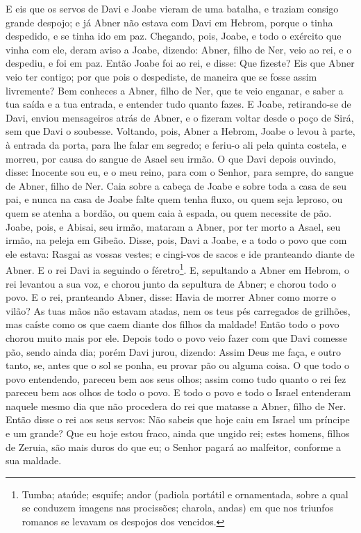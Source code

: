 E eis que os servos de Davi e Joabe vieram de uma batalha, e
traziam consigo grande despojo; e já Abner não estava com Davi em
Hebrom, porque o tinha despedido, e se tinha ido em paz.
Chegando, pois, Joabe, e todo o exército que vinha com ele,
deram aviso a Joabe, dizendo: Abner, filho de Ner, veio ao rei, e o
despediu, e foi em paz. Então Joabe foi ao rei, e disse: Que
fizeste? Eis que Abner veio ter contigo; por que pois o despediste,
de maneira que se fosse assim livremente? Bem conheces a
Abner, filho de Ner, que te veio enganar, e saber a tua saída e a
tua entrada, e entender tudo quanto fazes. E Joabe,
retirando-se de Davi, enviou mensageiros atrás de Abner, e o fizeram
voltar desde o poço de Sirá, sem que Davi o soubesse.
Voltando, pois, Abner a Hebrom, Joabe o levou à parte, à
entrada da porta, para lhe falar em segredo; e feriu-o ali pela
quinta costela, e morreu, por causa do sangue de Asael seu irmão.
O que Davi depois ouvindo, disse: Inocente sou eu, e o meu
reino, para com o Senhor, para sempre, do sangue de Abner, filho de
Ner. Caia sobre a cabeça de Joabe e sobre toda a casa de seu
pai, e nunca na casa de Joabe falte quem tenha fluxo, ou quem seja
leproso, ou quem se atenha a bordão, ou quem caia à espada, ou quem
necessite de pão. Joabe, pois, e Abisai, seu irmão, mataram a
Abner, por ter morto a Asael, seu irmão, na peleja em Gibeão.
Disse, pois, Davi a Joabe, e a todo o povo que com ele
estava: Rasgai as vossas vestes; e cingi-vos de sacos e ide
pranteando diante de Abner. E o rei Davi ia seguindo o
féretro\footnote{Tumba; ataúde; esquife; andor (padiola portátil e
ornamentada, sobre a qual se conduzem imagens nas procissões;
charola, andas) em que nos triunfos romanos se levavam os despojos
dos vencidos.}. E, sepultando a Abner em Hebrom, o rei
levantou a sua voz, e chorou junto da sepultura de Abner; e chorou
todo o povo. E o rei, pranteando Abner, disse: Havia de
morrer Abner como morre o vilão? As tuas mãos não estavam
atadas, nem os teus pés carregados de grilhões, mas caíste como os
que caem diante dos filhos da maldade! Então todo o povo chorou
muito mais por ele. Depois todo o povo veio fazer com que
Davi comesse pão, sendo ainda dia; porém Davi jurou, dizendo: Assim
Deus me faça, e outro tanto, se, antes que o sol se ponha, eu provar
pão ou alguma coisa. O que todo o povo entendendo, pareceu
bem aos seus olhos; assim como tudo quanto o rei fez pareceu bem aos
olhos de todo o povo. E todo o povo e todo o Israel
entenderam naquele mesmo dia que não procedera do rei que matasse a
Abner, filho de Ner. Então disse o rei aos seus servos: Não
sabeis que hoje caiu em Israel um príncipe e um grande? Que
eu hoje estou fraco, ainda que ungido rei; estes homens, filhos de
Zeruia, são mais duros do que eu; o Senhor pagará ao malfeitor,
conforme a sua maldade.



